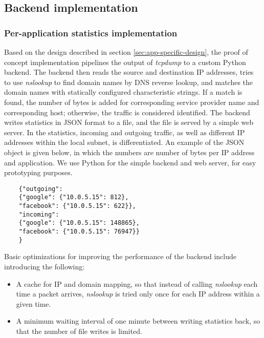 \subsection{Backend implementation}

\subsubsection{Per-application statistics implementation}

Based on the design described in section \ref{sec:app-specific-design}, the proof of concept implementation pipelines the output of \textit{tcpdump} to a custom Python backend. The backend then reads the source and destination IP addresses, tries to use \textit{nslookup} to find domain names by DNS reverse lookup, and matches the domain names with statically configured characteristic strings. If a match is found, the number of bytes is added for corresponding service provider name and corresponding host; otherwise, the traffic is considered identified. The backend writes statistics in JSON format to a file, and the file is served by a simple web server. In the statistics, incoming and outgoing traffic, as well as different IP addresses within the local subnet, is differentiated. An example of the JSON object is given below, in which the numbers are number of bytes per IP address and application. We use Python for the simple backend and web server, for easy prototyping purposes.

\begin{listing}
	\begin{verbatim}
	{"outgoing": 
	{"google": {"10.0.5.15": 812}, 
	"facebook": {"10.0.5.15": 622}}, 
	"incoming": 
	{"google": {"10.0.5.15": 148865}, 
	"facebook": {"10.0.5.15": 76947}}
	}
	\end{verbatim}
\end{listing}

Basic optimizations for improving the performance of the backend include introducing the following:
\begin{itemize}
	
	\item A cache for IP and domain mapping, so that instead of calling \textit{nslookup} each time a packet arrives, \textit{nslookup} is tried only once for each IP address within a given time.
	
	\item A minimum waiting interval of one minute between writing statistics back, so that the number of file writes is limited.
	
\end{itemize}
